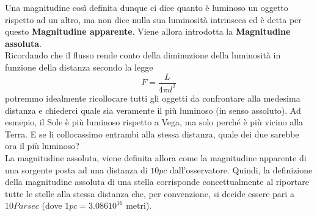 \documentclass[a4paper,11pt]{article}
\begin{document}
Una magnitudine così definita dunque ci dice quanto è luminoso un oggetto rispetto ad un altro, ma non dice nulla sua luminosità intrinseca ed è detta per questo \textbf{Magnitudine apparente}.  Viene allora introdotta la \textbf{Magnitudine assoluta}.\\
Ricordando che il flusso rende conto della diminuzione della luminosità in funzione della distanza secondo la legge 
\begin{equation*}
    F = \frac{L}{4\pi d^2}
\end{equation*}
potremmo idealmente ricollocare tutti gli oggetti da confrontare alla medesima distanza e chiederci quale sia veramente il più luminoso (in senso assoluto). Ad esmepio, il Sole è più luminoso rispetto a Vega, ma solo perché è più vicino alla Terra. E se li collocassimo entrambi alla stessa distanza, quale dei due sarebbe ora il più luminoso?\\ 
La magnitudine assoluta, viene definita allora come la magnitudine apparente di una sorgente posta ad una distanza di \(10 pc\) dall'osservatore.  
Quindi, la definizione della magnitudine assoluta di una stella corrisponde concettualmente al riportare tutte le stelle alla stessa distanza che, per convenzione, si decide essere pari a \(10 Parsec\) (dove \(1pc = 3.086 10^{16} \) metri).
\end{document}
